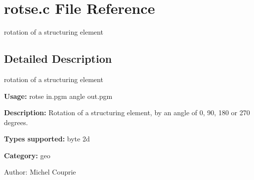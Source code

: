 \section{rotse.c File Reference}
\label{rotse_8c}
rotation of a structuring element  




\label{_details}
\subsection{Detailed Description}
rotation of a structuring element 

{\bf Usage:} rotse in.pgm angle out.pgm

{\bf Description:} Rotation of a structuring element, by an angle of 0, 90, 180 or 270 degrees.

{\bf Types supported:} byte 2d

{\bf Category:} geo

\begin{Desc}
\item[Author:]Michel Couprie \end{Desc}
